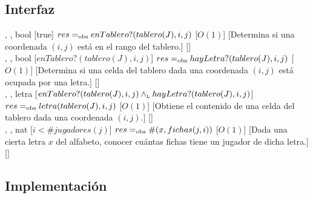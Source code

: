 \begin{interfaz}{\subsection{Interfaz}}
\begin{operaciones}
    \noindent{}
    {, , }{bool}
    [true]
    {$res=_{\mathrm{obs}} enTablero?(tablero(J),i,j)$}
    [$O(1)$]
    [Determina si una coordenada $(i,j)$ está en el rango del tablero.]
    [\falta]\\

    \noindent{}
    {, , }{bool}
    [$enTablero?(tablero(J),i,j)$]
    {$res=_{\mathrm{obs}} hayLetra?(tablero(J),i,j)$}
    [$O(1)$]
    [Determina si una celda del tablero dada una coordenada $(i,j)$ está ocupada por una letra.]
    [\falta]\\

    \noindent{}
    {, , }{letra}
    [$enTablero?(tablero(J),i,j)\land_{\mathrm{\scriptscriptstyle{L}}} hayLetra?(tablero(J),i,j)$]
    {$res=_{\mathrm{obs}} letra(tablero(J),i,j)$}
    [$O(1)$]
    [Obtiene el contenido de una celda del tablero dada una coordenada $(i,j)$.]
    [\falta]\\

    \noindent{}
    {, , }{nat}
    [$i < \#jugadores(j)$]
    {$res=_{\mathrm{obs}} \#(x,fichas(j,i))$}
    [$O(1)$]
    [Dada una cierta letra $x$ del alfabeto, conocer cuántas fichas tiene un jugador de dicha letra.]
    [\falta]\\

  \end{operaciones}
\end{interfaz}

\subsection{Implementación}

